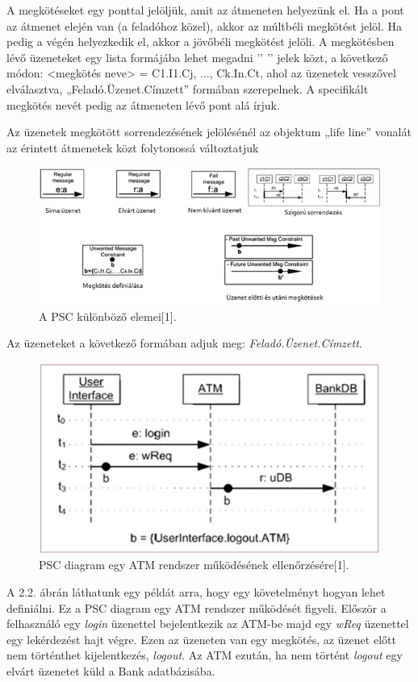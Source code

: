 A megkötéseket egy ponttal jelöljük, amit az átmeneten helyezünk el.
Ha a pont az átmenet elején van (a feladóhoz közel), akkor az múltbéli megkötést jelöl.
Ha pedig a végén helyezkedik el, akkor a jövőbéli megkötést jelöli.
A megkötésben lévő üzeneteket egy lista formájába lehet megadni ’{’ ’}’ jelek közt, a következő módon: <megkötés neve> = {C1.I1.Cj, ..., Ck.In.Ct}, ahol az üzenetek vesszővel elválasztva, „Feladó.Üzenet.Címzett” formában szerepelnek.
A specifikált megkötés nevét pedig az átmeneten lévő pont alá írjuk.

Az üzenetek megkötött sorrendezésének jelölésénél az objektum „life line” vonalát az érintett átmenetek közt folytonossá változtatjuk

\begin{figure}[!ht]
    \centering
    \includegraphics[width=150mm, keepaspectratio]{figures/2abra.png}
    \caption{A PSC különböző elemei[1].}
\end{figure}

Az üzeneteket a következő formában adjuk meg: \textit{Feladó.Üzenet.Címzett}.

\begin{figure}[!ht]
    \centering
    \includegraphics[width=130mm, keepaspectratio]{figures/3abra.png}
    \caption{PSC diagram egy ATM rendszer működésének ellenőrzésére[1].}
\end{figure}
A 2.2. ábrán láthatunk egy példát arra, hogy egy követelményt hogyan lehet definiálni.
Ez a PSC diagram egy ATM rendszer működését figyeli.
Először a felhasználó egy \textit{login} üzenettel bejelentkezik az ATM-be majd egy \textit{wReq} üzenettel egy lekérdezést hajt végre.
Ezen az üzeneten van egy megkötés, az üzenet előtt nem történthet kijelentkezés, \textit{logout}.
Az ATM ezután, ha nem történt \textit{logout} egy elvárt üzenetet küld a Bank adatbázisába.


